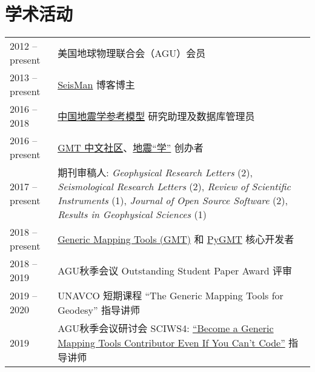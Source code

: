 \section*{学术活动}

\newcommand{\tabitem}{~~\llap{\textbullet}~~}

\begin{tabular}{p{} p{}}
2012 -- present & 美国地球物理联合会（AGU）会员 \\
2013 -- present & \href{https://blog.seisman.info}{SeisMan} 博客博主 \\
2016 -- 2018    & \href{http://chinageorefmodel.org/}{中国地震学参考模型} 研究助理及数据库管理员 \\
2016 -- present & \href{http://gmt-china.org/}{GMT 中文社区}、\href{https://seismo-learn.org/}{地震``学''} 创办者 \\
2017 -- present & 期刊审稿人:
                  \textit{Geophysical Research Letters} (2),
                  \textit{Seismological Research Letters} (2),
                  \textit{Review of Scientific Instruments} (1),
                  \textit{Journal of Open Source Software} (2),
                  \textit{Results in Geophysical Sciences} (1) \\
2018 -- present & \href{https://github.com/GenericMappingTools/gmt}{Generic Mapping Tools (GMT)} 和 \href{https://github.com/GenericMappingTools/pygmt}{PyGMT} 核心开发者 \\
2018 -- 2019 & AGU秋季会议 Outstanding Student Paper Award 评审 \\
2019 -- 2020 & UNAVCO 短期课程 ``The Generic Mapping Tools for Geodesy'' 指导讲师 \\
2019 & AGU秋季会议研讨会 SCIWS4: \href{https://www.agu.org/Events/SCIWS4-Generic-Mapping-Tools}{``Become a Generic Mapping Tools Contributor Even If You Can't Code''} 指导讲师 \\
\end{tabular}
